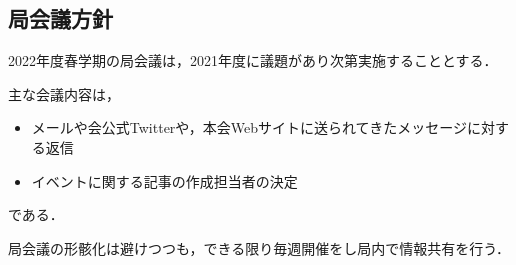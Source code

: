 \subsection*{局会議方針}



2022年度春学期の局会議は，2021年度に議題があり次第実施することとする．

主な会議内容は，
\begin{itemize}
	\item メールや会公式Twitterや，本会Webサイトに送られてきたメッセージに対する返信
	\item イベントに関する記事の作成担当者の決定
\end{itemize}
である．

局会議の形骸化は避けつつも，できる限り毎週開催をし局内で情報共有を行う．
